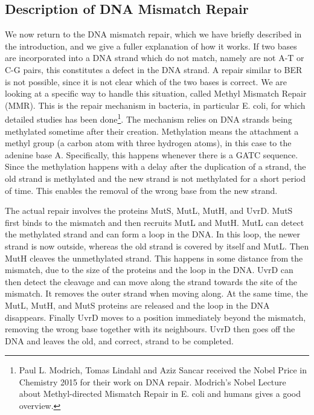 
\subsection{Description of DNA Mismatch Repair}

We now return to the DNA mismatch repair, which we have briefly described in the introduction, and we give a fuller explanation of how it works.
If two bases are incorporated into a DNA strand which do not match, namely are not A-T or C-G pairs, this constitutes a defect in the DNA strand. A repair similar to BER is not possible, since it is not clear which of the two bases is correct.
We are looking at a specific way to handle this situation, called Methyl Mismatch Repair (MMR). This is the repair mechanism in bacteria, in particular E.\! coli, for which detailed studies has been done\footnote{Paul L. Modrich, Tomas Lindahl and Aziz Sancar received the Nobel Price in Chemistry 2015 for their work on DNA repair. Modrich's Nobel Lecture about Methyl-directed Mismatch Repair in E. coli and humans \cite{pmid27198632} gives a good overview.}.
The mechanism relies on DNA strands being methylated sometime after their creation. Methylation means the attachment a methyl group (a carbon atom with three hydrogen atoms), in this case to the adenine base A. Specifically, this happens whenever there is a GATC sequence. Since the methylation %
happens with a delay after the duplication of a strand, the old strand is methylated and the new strand is not methylated for a short period of time. This enables the removal of the wrong base from the new strand.

The actual repair involves the proteins MutS, MutL, MutH, and UvrD. MutS first binds to the mismatch and then recruits MutL and MutH. MutL can detect the methylated strand and can form a loop in the DNA. In this loop, the newer strand is now outside, whereas the old strand is covered by itself and MutL. Then MutH cleaves the unmethylated strand. This happens in some distance from the mismatch, due to the size of the proteins and the loop in the DNA. UvrD can then detect the cleavage and can move along the strand towards the site of the mismatch. It removes the outer strand when moving along. At the same time, the MutL, MutH, and MutS proteins are released and the loop in the DNA disappears. Finally UvrD moves to a position immediately beyond the mismatch, removing the wrong base together with its neighbours. UvrD then goes off the DNA and leaves the old, and correct, strand to be completed.

